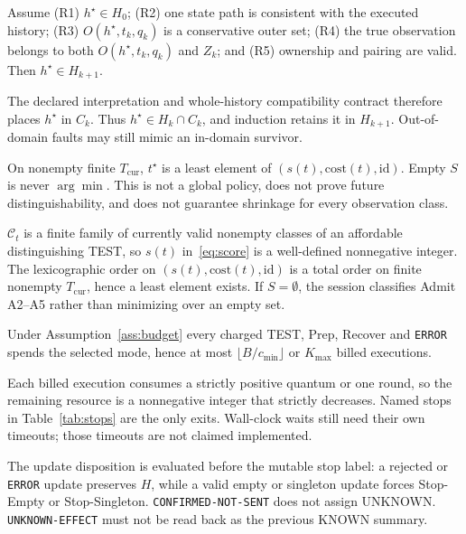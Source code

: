 \begin{proposition}
\label{prop:retain}
Assume (R1) \(h^{\star}\in H_0\); (R2) one state path is consistent with the
executed history; (R3) \(O(h^{\star},t_k,q_k)\) is a conservative outer set;
(R4) the true observation belongs to both \(O(h^{\star},t_k,q_k)\) and \(Z_k\);
and (R5) ownership and pairing are valid. Then \(h^{\star}\in H_{k+1}\).
\end{proposition}
\begin{IEEEproof}
The declared interpretation and whole-history compatibility contract therefore
places \(h^{\star}\) in \(C_k\). Thus \(h^{\star}\in H_k\cap C_k\), and induction
retains it in \(H_{k+1}\). Out-of-domain faults may still mimic an in-domain
survivor.
\end{IEEEproof}

\begin{proposition}
\label{prop:c2}
On nonempty finite \(T_{\mathrm{cur}}\), \(t^{\star}\) is a least element of
\((s(t),\mathrm{cost}(t),\mathrm{id})\). Empty \(S\) is never \(\arg\min\).
This is not a global policy, does not prove future distinguishability, and
does not guarantee shrinkage for every observation class.
\end{proposition}
\begin{IEEEproof}
\(\mathcal{C}_t\) is a finite family of currently valid nonempty classes of an
affordable distinguishing TEST, so \(s(t)\) in~\eqref{eq:score} is a well-defined
nonnegative integer. The lexicographic order on
\((s(t),\mathrm{cost}(t),\mathrm{id})\) is a total order on finite nonempty
\(T_{\mathrm{cur}}\), hence a least element exists. If \(S=\emptyset\), the
session classifies Admit A2--A5 rather than minimizing over an empty set.
\end{IEEEproof}

\begin{proposition}[Termination]
\label{prop:term}
Under Assumption~\ref{ass:budget} every charged TEST, Prep, Recover and
\texttt{ERROR} spends the selected mode, hence at most
\(\lfloor B/c_{\min}\rfloor\) or \(K_{\max}\) billed executions.
\end{proposition}
\begin{IEEEproof}
Each billed execution consumes a strictly positive quantum or one round, so
the remaining resource is a nonnegative integer that strictly decreases.
Named stops in Table~\ref{tab:stops} are the only exits. Wall-clock waits still
need their own timeouts; those timeouts are not claimed implemented.
\end{IEEEproof}

The update disposition is evaluated before the mutable stop label: a rejected
or \texttt{ERROR} update preserves \(H\), while a valid empty or singleton
update forces Stop-Empty or Stop-Singleton. \texttt{CONFIRMED-NOT-SENT} does
not assign UNKNOWN. \texttt{UNKNOWN-EFFECT} must not be read back as the
previous KNOWN summary.
